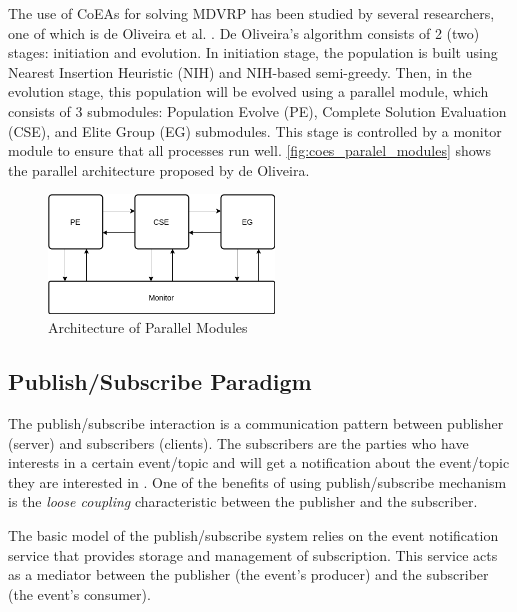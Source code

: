 \documentclass[conference]{IEEEtran}
\begin{document}
The use of CoEAs for solving MDVRP has been studied by several researchers, one of which is de Oliveira et al. \cite{de_oliveira_cooperative_2016}. De Oliveira's algorithm consists of 2 (two) stages: initiation and evolution. In initiation stage, the population is built using Nearest Insertion Heuristic (NIH) and NIH-based semi-greedy. Then, in the evolution stage, this population will be evolved using a parallel module, which consists of 3 submodules: Population Evolve (PE), Complete Solution Evaluation (CSE), and Elite Group (EG) submodules. This stage is controlled by a monitor module to ensure that all processes run well. \autoref{fig:coes_paralel_modules} shows the parallel architecture proposed by de Oliveira.


\begin{figure}[!]
	\centering
	\includegraphics[width=6cm]{Resources/Images/coes_paralel_modules}
	\caption{Architecture of Parallel Modules \cite{de_oliveira_cooperative_2016}}
	\label{fig:coes_paralel_modules}
\end{figure}


\subsection{Publish/Subscribe Paradigm}
\label{ssec:pub-sub}
The publish/subscribe interaction is a communication pattern between publisher (server) and subscribers (clients). The subscribers are the parties who have interests in a certain event/topic and will get a notification about the event/topic they are interested in \cite{eugster_many_2003}. One of the benefits of using publish/subscribe mechanism is the \textit{loose coupling} characteristic \cite{eugster_many_2003} between the publisher and the subscriber.

The basic model of the publish/subscribe system relies on the event notification service that provides storage and management of subscription. This service acts as a mediator between the publisher (the event's producer) and the subscriber (the event's consumer).
\end{document}
